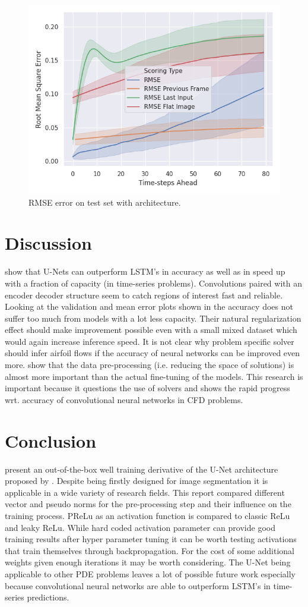 \documentclass[acmtog]{techreportacmart}
\begin{document}
\begin{figure}[H]
  \includegraphics[width=.4\textwidth]{figures/transfer/Transfer_Test_RMSE_Quality_start_15}
  \caption{RMSE error on test set with \cite{Fotiadis2020} architecture.}
  \label{fig:T2}
\end{figure}


\section{Discussion}
\cite{Fotiadis2020} show that U-Nets can outperform LSTM's in accuracy as well as in speed up with a fraction of capacity (in time-series problems). Convolutions paired with an encoder decoder structure seem to catch regions of interest fast and reliable. Looking at the validation and mean error plots shown in \cite{Thuerey20} the accuracy does not suffer too much from models with a lot less capacity. Their natural regularization effect should make improvement possible even with a small mixed dataset which would again increase inference speed. It is not clear why problem specific solver should infer airfoil flows if the accuracy of neural networks can be improved even more. \cite{Thuerey20} show that the data pre-processing (i.e. reducing the space of solutions) is almost more important than the actual fine-tuning of the models. This research is important because it questions the use of solvers and shows the rapid progress wrt. accuracy of convolutional neural networks in CFD problems.

\section{Conclusion} 
\cite{Thuerey20} present an out-of-the-box well training derivative of the U-Net architecture proposed by \cite{ronneberger2015}. Despite being firstly designed for image segmentation it is applicable in a wide variety of research fields. This report compared different vector and pseudo norms for the pre-processing step and their influence on the training process. PReLu as an activation function is compared to classic ReLu and leaky ReLu. While hard coded activation parameter can provide good training results after hyper parameter tuning it can be worth testing activations that train themselves through backpropagation. For the cost of some additional weights given enough iterations it may be worth considering. The U-Net being applicable to other PDE problems leaves a lot of possible future work especially because convolutional neural networks are able to outperform LSTM's in time-series predictions.\\
\end{document}
